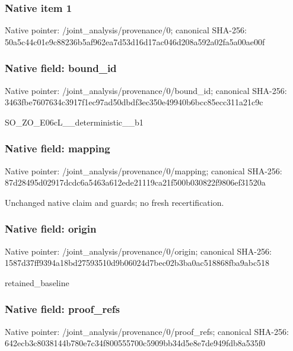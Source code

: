 \documentclass[10pt,a4paper]{article}
\begin{document}
\subsubsection{Native item 1}


Native pointer: /joint\_analysis/provenance/0; canonical SHA-256: 50a5c44c01e9c88236b5af96\allowbreak{}2ea7d53d16d17ac046d208a5\allowbreak{}92a02fa5a00ae00f



\subsubsection{Native field: bound\_id}


Native pointer: /joint\_analysis/provenance/0/bound\_id; canonical SHA-256: 3463fbe7607634c3917f1ec9\allowbreak{}7ad50dbdf3ec350e49940b6b\allowbreak{}cc85ecc311a21c9c


SO\_ZO\_E06cL\_\_deterministic\_\_b1


\subsubsection{Native field: mapping}


Native pointer: /joint\_analysis/provenance/0/mapping; canonical SHA-256: 87d28495d02917dcdc6a5463\allowbreak{}a612ede21119ca21f500b030\allowbreak{}822f9806ef31520a


Unchanged native claim and guards; no fresh recertification.


\subsubsection{Native field: origin}


Native pointer: /joint\_analysis/provenance/0/origin; canonical SHA-256: 1587d37ff9394a18bd275935\allowbreak{}10d9b06024d7bec02b3ba0ac\allowbreak{}518868fba9abc518


retained\_baseline


\subsubsection{Native field: proof\_refs}


Native pointer: /joint\_analysis/provenance/0/proof\_refs; canonical SHA-256: 642ecb3c8038144b780e7c34\allowbreak{}f800555700c5909bb34d5e8e\allowbreak{}7de949fdb8a535f0
\end{document}
